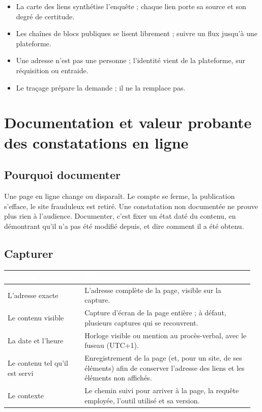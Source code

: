 \begin{boxresume}
\begin{itemize}
\item La carte des liens synthétise l'enquête ; chaque lien porte sa source et son degré de certitude.
\item Les chaînes de blocs publiques se lisent librement ; suivre un flux jusqu'à une plateforme.
\item Une adresse n'est pas une personne ; l'identité vient de la plateforme, sur réquisition ou entraide.
\item Le traçage prépare la demande ; il ne la remplace pas.
\end{itemize}
\end{boxresume}

\section{Documentation et valeur probante des constatations en ligne}

\subsection{Pourquoi documenter}

Une page en ligne change ou disparaît. Le compte se ferme, la publication s'efface, le site frauduleux est retiré. Une constatation non documentée ne prouve plus rien à l'audience. Documenter, c'est fixer un état daté du contenu, en démontrant qu'il n'a pas été modifié depuis, et dire comment il a été obtenu.

\subsection{Capturer}

\begin{longtable}{p{0.30\linewidth}p{0.66\linewidth}}
\rowcolor{TableauEntete}\textcolor{white}{\bfseries Élément à capturer} & \textcolor{white}{\bfseries Précision} \\ \hline
L'adresse exacte & L'adresse complète de la page, visible sur la capture. \\
Le contenu visible & Capture d'écran de la page entière ; à défaut, plusieurs captures qui se recouvrent. \\
La date et l'heure & Horloge visible ou mention au procès-verbal, avec le fuseau (UTC+1). \\
Le contenu tel qu'il est servi & Enregistrement de la page (et, pour un site, de ses éléments) afin de conserver l'adresse des liens et les éléments non affichés. \\
Le contexte & Le chemin suivi pour arriver à la page, la requête employée, l'outil utilisé et sa version. \\
\end{longtable}

